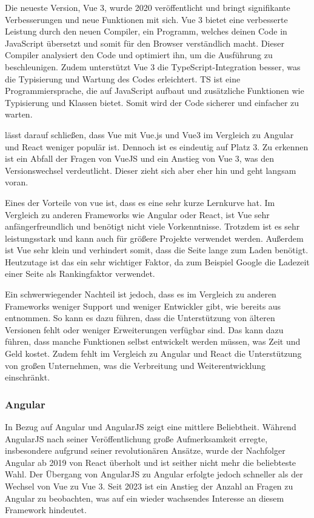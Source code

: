 \documentclass[biblatex]{lni}
\begin{document}
Die neueste Version, Vue 3,
wurde 2020 veröffentlicht und bringt signifikante Verbesserungen und neue Funktionen mit sich. \cite{vue}
Vue 3 bietet eine verbesserte Leistung durch den neuen Compiler, ein Programm, welches deinen Code in JavaScript übersetzt und somit für den Browser verständlich macht.
Dieser Compiler analysiert den Code und optimiert ihn, um die Ausführung zu beschleunigen.
Zudem unterstützt Vue 3 die TypeScript-Integration besser, was die Typisierung und Wartung des Codes erleichtert.
\ac{TS} ist eine Programmiersprache, die auf JavaScript aufbaut und zusätzliche Funktionen wie Typisierung und Klassen bietet. \cite{ts}
Somit wird der Code sicherer und einfacher zu warten.

 lässt darauf schließen,
dass Vue mit Vue.js und Vue3 im Vergleich zu Angular und React weniger populär ist.
Dennoch ist es eindeutig auf Platz 3.
Zu erkennen ist ein Abfall der Fragen von VueJS und ein Anstieg von Vue 3, was den Versionswechsel verdeutlicht.
Dieser zieht sich aber eher hin und geht langsam voran.

Eines der Vorteile von vue ist, dass es eine sehr kurze Lernkurve hat. \cite{Dev}
Im Vergleich zu anderen Frameworks wie Angular oder React,
ist Vue sehr anfängerfreundlich und benötigt nicht viele Vorkenntnisse.
Trotzdem ist es sehr leistungsstark und kann auch für größere Projekte verwendet werden.
Außerdem ist Vue sehr klein und verhindert somit, dass die Seite lange zum Laden benötigt.
Heutzutage ist das ein sehr wichtiger Faktor, da zum Beispiel Google die Ladezeit einer Seite als Rankingfaktor verwendet. \cite{GLZ}

Ein schwerwiegender Nachteil ist jedoch, dass es im Vergleich zu anderen Frameworks weniger Support und weniger Entwickler gibt, wie bereits aus  entnommen. \cite{BStack}
So kann es dazu führen, dass die Unterstützung von älteren Versionen fehlt oder weniger Erweiterungen verfügbar sind.
Das kann dazu führen, dass manche Funktionen selbst entwickelt werden müssen, was Zeit und Geld kostet.
Zudem fehlt im Vergleich zu Angular und React die Unterstützung von großen Unternehmen, was die Verbreitung und Weiterentwicklung einschränkt.

\subsubsection{Angular}

In Bezug auf Angular und AngularJS zeigt  eine mittlere Beliebtheit.
Während AngularJS nach seiner Veröffentlichung große Aufmerksamkeit erregte,
insbesondere aufgrund seiner revolutionären Ansätze,
wurde der Nachfolger Angular ab 2019 von React überholt und ist seither nicht mehr die beliebteste Wahl.
Der Übergang von AngularJS zu Angular erfolgte jedoch schneller als der Wechsel von Vue zu Vue 3.
Seit 2023 ist ein Anstieg der Anzahl an Fragen zu Angular zu beobachten,
was auf ein wieder wachsendes Interesse an diesem Framework hindeutet.
\end{document}
